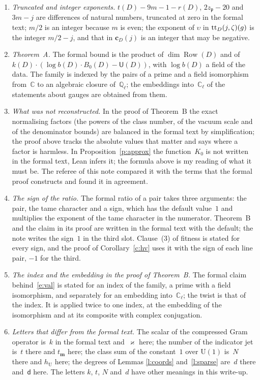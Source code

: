 \documentclass[11pt,a4paper]{article}
\newcommand{\m}[1]{\mbox{$#1$}}        %
\theoremstyle{plainx}
\theoremstyle{uprightx}
\newcommand{\CC}{\mathbb{C}}
\newcommand{\UU}{\mathrm{U}}
\newcommand{\clU}{h_{\UU}}                    %
\newcommand{\tm}{t_{\mathbf{m}}}              %
\newcommand{\carrierChar}[1]{\mathbf{c}_D(#1)}
\begin{document}
\begin{enumerate}[label=\textup{\arabic*.},leftmargin=1.6em,itemsep=5pt]
\item \emph{Truncated and integer exponents.} \m{t(D)-9m-1-r(D)}, \m{2z_{\mathfrak{p}}-20} and \m{3m-j} are differences of natural
numbers, truncated at zero in the formal text; \m{m/2} is an integer because $m$ is even; the exponent of
\m{\upsilon} in \m{\tableTheta{j}{\zeta}{g}} is the integer \m{m/2-j}, and that in \m{\carrierChar{j}} is an integer that may be
negative.
\item \emph{Theorem~A.} The formal bound is the product of \m{\dim\operatorname{Row}(D)} and of
$k(D)\cdot(\log b(D)\cdot B_0(D)-\mathsf{U}(D))$, with \m{\log b(D)} a field of the data. The family is indexed by the pairs of a prime and a field isomorphism from~$\CC$
to an algebraic closure of~$\mathbb{Q}_\ell$; the embeddings into~$\CC_\ell$ of the statements about gauges are obtained
from them.
\item \emph{What was not reconstructed.} In the proof of Theorem~B the exact normalising factors (the powers of
the class number, of the vacuum scale and of the denominator bounds) are balanced in the formal text by
simplification; the proof above tracks the absolute values that matter and says where a factor is harmless. In
Proposition~\ref{p:approx} the function~$K_0$ is not written in the formal text, Lean infers it; the formula above is
my reading of what it must be. The referee of this note compared it with the terms that the formal proof constructs
and found it in agreement.
\item \emph{The sign of the ratio.} The formal ratio of a pair takes three arguments: the pair, the tame character
and a sign, which has the default value~$1$ and multiplies the exponent of the tame character in the numerator.
Theorem~B and the claim in its proof are written in the formal text with the default; the note writes the sign~$1$
in the third slot. Clause~(3) of fitness is stated for every sign, and the proof of Corollary~\ref{c:hv} uses it with
the sign of each line pair, \m{-1} for the third.
\item \emph{The index and the embedding in the proof of Theorem~B.} The formal claim behind~\eqref{e:val} is stated
for an index of the family, a prime with a field isomorphism, and separately for an embedding into~$\CC_\ell$; the
twist is that of the index. It is applied twice to one index, at the embedding of the isomorphism and at its
composite with complex conjugation.
\item \emph{Letters that differ from the formal text.} The scalar of the compressed Gram operator is~$k$ in the
formal text and~$\varkappa$ here; the number of the indicator jet is~$t$ there and \m{\tm} here; the class sum of the
constant~$1$ over \m{\UU(1)} is~$N$ there and \m{\clU} here; the degrees of Lemmas \ref{l:coords} and~\ref{l:sparse}
are~$d$ there and~$\mathsf{d}$ here. The letters $k$, $t$, $N$ and~$d$ have other meanings in this write-up.
\end{enumerate}
\end{document}
